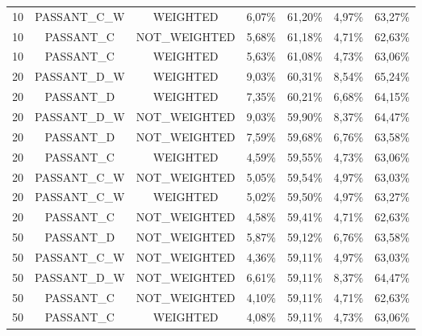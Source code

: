 \begin{table}[H]
{\begin{tabular}{ccccccc}
		10 & PASSANT\_C\_W &   WEIGHTED &     6,07\% &    61,20\% &     4,97\% &    63,27\% \\
		
		10 &  PASSANT\_C & NOT\_WEIGHTED &     5,68\% &    61,18\% &     4,71\% &    62,63\% \\
		
		10 &  PASSANT\_C &   WEIGHTED &     5,63\% &    61,08\% &     4,73\% &    63,06\% \\
		
		20 & PASSANT\_D\_W &   WEIGHTED &     9,03\% &    60,31\% &     8,54\% &    65,24\% \\
		
		20 &  PASSANT\_D &   WEIGHTED &     7,35\% &    60,21\% &     6,68\% &    64,15\% \\
		
		20 & PASSANT\_D\_W & NOT\_WEIGHTED &     9,03\% &    59,90\% &     8,37\% &    64,47\% \\
		
		20 &  PASSANT\_D & NOT\_WEIGHTED &     7,59\% &    59,68\% &     6,76\% &    63,58\% \\
		
		20 &  PASSANT\_C &   WEIGHTED &     4,59\% &    59,55\% &     4,73\% &    63,06\% \\
		
		20 & PASSANT\_C\_W & NOT\_WEIGHTED &     5,05\% &    59,54\% &     4,97\% &    63,03\% \\
		
		20 & PASSANT\_C\_W &   WEIGHTED &     5,02\% &    59,50\% &     4,97\% &    63,27\% \\
		
		20 &  PASSANT\_C & NOT\_WEIGHTED &     4,58\% &    59,41\% &     4,71\% &    62,63\% \\
		
		50 &  PASSANT\_D & NOT\_WEIGHTED &     5,87\% &    59,12\% &     6,76\% &    63,58\% \\
		
		50 & PASSANT\_C\_W & NOT\_WEIGHTED &     4,36\% &    59,11\% &     4,97\% &    63,03\% \\
		
		50 & PASSANT\_D\_W & NOT\_WEIGHTED &     6,61\% &    59,11\% &     8,37\% &    64,47\% \\
		
		50 &  PASSANT\_C & NOT\_WEIGHTED &     4,10\% &    59,11\% &     4,71\% &    62,63\% \\
		
		50 &  PASSANT\_C &   WEIGHTED &     4,08\% &    59,11\% &     4,73\% &    63,06\% \\
		

\end{tabular}}
\end{table}
